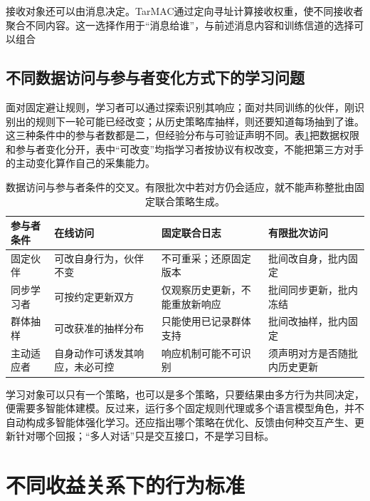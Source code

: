 接收对象还可以由消息决定。TarMAC通过定向寻址计算接收权重，使不同接收者聚合不同内容。这一选择作用于“消息给谁”，与前述消息内容和训练信道的选择可以组合

\subsection{不同数据访问与参与者变化方式下的学习问题}
\label{sec:rl-multi-agent-access}

面对固定避让规则，学习者可以通过探索识别其响应；面对共同训练的伙伴，刚识别出的规则下一轮可能已经改变；从历史策略库抽样，则还要知道每场抽到了谁。这三种条件中的参与者数都是二，但经验分布与可验证声明不同。表\ref{tab:rl-multi-agent-access}把数据权限和参与者变化分开，表中“可改变”均指学习者按协议有权改变，不能把第三方对手的主动变化算作自己的采集能力。

\begin{table}[htbp]
 \centering
 \begin{tabularx}{\linewidth}{@{}l >{\raggedright\arraybackslash}X >{\raggedright\arraybackslash}X >{\raggedright\arraybackslash}X@{}}
 \toprule
 参与者条件 & 在线访问 & 固定联合日志 & 有限批次访问\\
 \midrule
 固定伙伴 & 可改自身行为，伙伴不变 & 不可重采；还原固定版本 & 批间改自身，批内固定\\
 同步学习者 & 可按约定更新双方 & 仅观察历史更新，不能重放新响应 & 批间同步更新，批内冻结\\
 群体抽样 & 可改获准的抽样分布 & 只能使用已记录群体支持 & 批间改抽样，批内固定\\
 主动适应者 & 自身动作可诱发其响应，未必可控 & 响应机制可能不可识别 & 须声明对方是否随批内历史更新\\
 \bottomrule
 \end{tabularx}
 \caption{数据访问与参与者条件的交叉。有限批次中若对方仍会适应，就不能声称整批由固定联合策略生成。}
 \label{tab:rl-multi-agent-access}
\end{table}

学习对象可以只有一个策略，也可以是多个策略，只要结果由多方行为共同决定，便需要多智能体建模。反过来，运行多个固定规则代理或多个语言模型角色，并不自动构成多智能体强化学习。还应指出哪个策略在优化、反馈由何种交互产生、更新针对哪个回报；“多人对话”只是交互接口，不是学习目标。

\section{不同收益关系下的行为标准}
\label{sec:rl-multi-agent-solutions}

